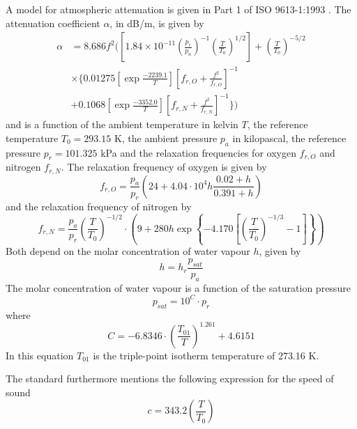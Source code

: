 A model for atmospheric attenuation is given in Part 1 of ISO 9613-1:1993 \cite{ISO9613-1}.
The attenuation coefficient $\alpha$, in dB/m, is given by
\begin{align}\label{eq:theory:sound:atmospheric-attenuation}
 \alpha &= 8.686 f^2 \Biggl( \left[ 1.84 \times 10^{-11} \left(\frac{p_r}{p_a}\right)^{-1} \left(\frac{T}{T_0}\right)^{1/2} \right] + \left(\frac{T}{T_0}\right)^{-5/2} \nonumber \\ 
 &\times \Biggl\{ 0.01275 \left[ \exp{\frac{-2239.1}{T}} \right]  \left[f_{r,O} + \frac{f^2}{f_{r,O}} \right]^{-1} \nonumber \\
 &+ 0.1068 \left[ \exp{\frac{-3352.0}{T}} \right] \left[ f_{r,N} + \frac{f^2}{f_{r,N}} \right]^{-1} \Biggr\} \Biggr) 
\end{align}
and is a function of the ambient temperature in kelvin $T$, the reference
temperature $T_0=293.15$ K, the ambient pressure $p_a$ in kilopascal, the
reference pressure $p_r=101.325$ kPa and the relaxation frequencies for oxygen 
$f_{r,O}$ and nitrogen $f_{r,N}$.
The relaxation frequency of oxygen is given by
\begin{equation}
 f_{r,O} = \frac{p_a}{p_r} \left( 24 + 4.04 \cdot 10^4 h \frac{0.02 + h}{0.391 + h}  \right)
\end{equation}
and the relaxation frequency of nitrogen by
\begin{equation}
 f_{r,N} = \frac{p_a}{p_r} \left( \frac{T}{T_0} \right)^{-1/2} \cdot \left( 9 + 280 h \exp{\left\{ -4.170 \left[ \left(\frac{T}{T_0} \right)^{-1/3} -1 \right] \right\} } \right)
\end{equation}
Both depend on the molar concentration of water vapour $h$, given by
\begin{equation}
 h = h_r  \frac{p_{sat}}{p_a}
\end{equation}
The molar concentration of water vapour is a function of the saturation pressure
\begin{equation}
 p_{sat} = 10^C \cdot p_r
\end{equation}
where 
\begin{equation}
 C = -6.8346 \cdot \left( \frac{T_{01}}{T} \right)^{1.261}  + 4.6151
\end{equation}
In this equation $T_{01}$ is the triple-point isotherm temperature of 273.16 K.

The standard furthermore mentions the following expression for the speed of sound
\begin{equation}
c = 343.2 \left( \frac{T}{T_0} \right)
\end{equation}

